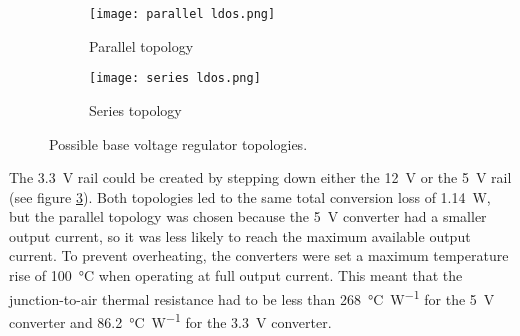 \begin{figure}[htb]
	\centering
	\begin{subfigure}[b]{0.35\linewidth}
		\texttt{[image: parallel ldos.png]}
		\caption{Parallel topology}
		\label{fig: parallel ldos}
	\end{subfigure}
	\begin{subfigure}[b]{0.5\linewidth}
		\texttt{[image: series ldos.png]}
		\caption{Series topology}
		\label{fig: series ldos}
	\end{subfigure}
	\caption{Possible base voltage regulator topologies.}
	\label{fig: base ldos}
\end{figure}

The \SI{3.3}{\volt} rail could be created by stepping down either the \SI{12}{\volt} or the \SI{5}{\volt} rail (see figure \ref{fig: base ldos}). Both topologies led to the same total conversion loss of \SI{1.14}{\watt}, but the parallel topology was chosen because the \SI{5}{\volt} converter had a smaller output current, so it was less likely to reach the maximum available output current. To prevent overheating, the converters were set a maximum temperature rise of \SI{100}{\celsius} when operating at full output current. This meant that the junction-to-air thermal resistance had to be less than \SI{268}{\celsius\per\watt} for the \SI{5}{\volt} converter and \SI{86.2}{\celsius\per\watt} for the \SI{3.3}{\volt} converter. \\

